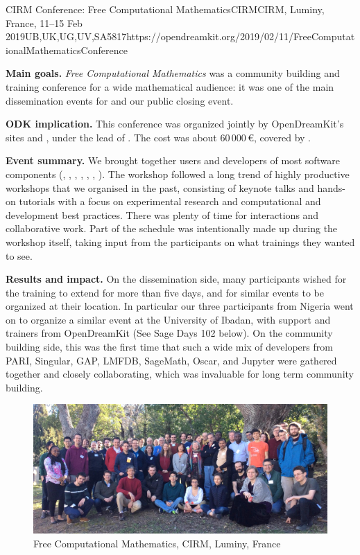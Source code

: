 \begin{event}{CIRM Conference: Free Computational Mathematics}{CIRM}{CIRM, Luminy, France, 11--15 Feb 2019}{UB,UK,UG,UV,SA}{58}{17}{https://opendreamkit.org/2019/02/11/FreeComputationalMathematicsConference}

\textbf{Main goals.} \emph{Free Computational Mathematics} was
a community building and training conference for a wide mathematical audience:
it was one of the main dissemination events for \ODK and our public closing event.

\textbf{ODK implication.} This conference was organized jointly by
OpenDreamKit's sites  and , under the lead of .
The cost was about 60\,000\,\euro, covered by .

\textbf{Event summary.}
We brought together users and developers of most \ODK software components
(\GAP, \Jupyter, \Linbox, \MPIR, \PariGP, \Sage, \Singular).
The workshop followed a long trend of highly productive workshops that we organised in the past,
consisting of keynote talks and hands-on tutorials with a focus on experimental research
and computational and development best practices.
There was plenty of time for interactions and collaborative work.
Part of the schedule was intentionally made up during the workshop itself,
taking input from the participants on what trainings they wanted to see.


\textbf{Results and impact.} On the dissemination side, many
participants wished for the training to extend for more than five
days, and for similar events to be organized at their location. In
particular our three participants from Nigeria went on to organize a
similar event at the University of Ibadan, with support and trainers
from OpenDreamKit (See Sage Days 102 below). On the community building
side, this was the first time that such a wide mix of developers from
PARI, Singular, GAP, LMFDB, SageMath, Oscar, and Jupyter were gathered
together and closely collaborating, which was invaluable for long term
community building.

\begin{figure}[ht]
  \includegraphics[width=.75\textwidth]{CIRM.jpg}
  \caption*{Free Computational Mathematics, CIRM, Luminy, France}
\end{figure}

\end{event}
